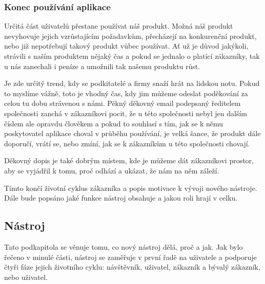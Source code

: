 \documentclass[bc,female,java,dept456]{diploma}						%
\begin{document}
\subsubsection{Konec používání aplikace}

Určitá část uživatelů přestane používat náš produkt. Možná náš produkt nevyhovuje jejich vzrůstajícím požadavkům, přecházejí na konkurenční produkt, nebo již nepotřebují takový produkt vůbec používat. Ať už je důvod jakýkoli, strávili s naším produktem nějaký čas a pokud se jednalo o platící zákazníky, tak u nás zanechali i peníze a umožnili tak našemu produktu růst.

Je zde určitý trend, kdy se podkitatelé a firmy snaží hrát na lidskou notu. Pokud to myslíme vážně, toto je vhodný čas, kdy jim můžeme odeslat poděkování za celou tu dobu strávenou s námi. Pěkný děkovný email podepsaný ředitelem společnosti zanchá v zákazníkovi pocit, že u této společnosti nebyl jen dalším číslem ale opravdu člověkem a pokud to souhlasí s tím, jak se k němu poskytovatel aplikace choval v průběhu používání, je velká šance, že produkt dále doporučí, vrátí se, nebo zmíní, jak se k zákazníkům u této společnosti chovají.

Děkovný dopis je také dobrým místem, kde je můžeme dát zákazníkovi prostor, aby se vyjádřil k tomu, proč odhází a ukázat, že nám na něm záleží.

\bigskip

Tímto končí životní cyklus zákazníka a popis motivace k vývoji nového nástroje. Dále bude popsáno jaké funkce nástroj obsahuje a jakou roli hrají v celku.










\subsection{Nástroj}

Tato podkapitola se věnuje tomu, co nový nástroj dělá, proč a jak. Jak bylo řečeno v minulé části, nástroj se zaměřuje v první řadě na uživatele a podporuje čtyři fáze jejich životního cyklu: návštěvník, uživatel, zákazník a bývalý zákazník, nebo uživatel.
\end{document}
